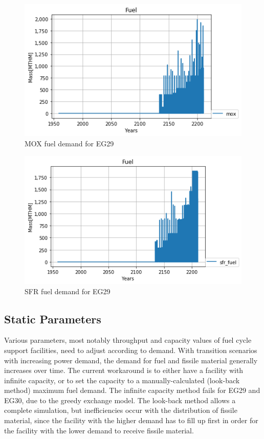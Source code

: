 \documentclass{article}
\begin{document}
\begin{figure}[htbp!]
	\begin{center}
		\includegraphics[scale=0.6]{./images/mox_fuel.png}
	\end{center}
	\caption{\gls{MOX} fuel demand for EG29}
	\label{fig:mox}
\end{figure}
\begin{figure}[htbp!]
	\begin{center}
		\includegraphics[scale=0.6]{./images/sfr_fuel.png}
	\end{center}
	\caption{\gls{SFR} fuel demand for EG29}
	\label{fig:sfr}
\end{figure}
\FloatBarrier


\subsection{Static Parameters}
Various parameters, most notably throughput and capacity values of fuel cycle support facilities,
need to adjust according to demand. With transition scenarios with increasing power demand, the 
demand for fuel and fissile material generally increases over time. The current workaround is to either
have a facility with infinite capacity, or to set the capacity to a manually-calculated (look-back method)
maximum fuel demand. The infinite capacity method fails for EG29 and EG30, due to the greedy exchange
model. The look-back method allows a complete simulation, but inefficiencies occur with the distribution
of fissile material, since the facility with the higher demand has to fill up first in order for the facility
with the lower demand to receive fissile material. 
\end{document}
